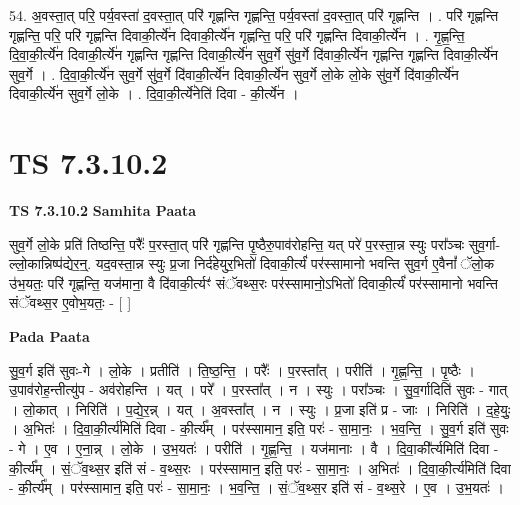 \documentclass[17pt]{extarticle}
\begin{document}
54. अ॒वस्ता॒त् परि॒ पर्य॒वस्ता॑ द॒वस्ता॒त् परि॑ गृह्णन्ति गृह्णन्ति॒ पर्य॒वस्ता॑ द॒वस्ता॒त् परि॑ गृह्णन्ति । . परि॑ गृह्णन्ति गृह्णन्ति॒ परि॒ परि॑ गृह्णन्ति दिवाकी॒र्त्ये॑न दिवाकी॒र्त्ये॑न गृह्णन्ति॒ परि॒ परि॑ गृह्णन्ति दिवाकी॒र्त्ये॑न । . गृ॒ह्ण॒न्ति॒ दि॒वा॒की॒र्त्ये॑न दिवाकी॒र्त्ये॑न गृह्णन्ति गृह्णन्ति दिवाकी॒र्त्ये॑न सुव॒र्गे सु॑व॒र्गे दि॑वाकी॒र्त्ये॑न गृह्णन्ति गृह्णन्ति दिवाकी॒र्त्ये॑न सुव॒र्गे । . दि॒वा॒की॒र्त्ये॑न सुव॒र्गे सु॑व॒र्गे दि॑वाकी॒र्त्ये॑न दिवाकी॒र्त्ये॑न सुव॒र्गे लो॒के लो॒के सु॑व॒र्गे दि॑वाकी॒र्त्ये॑न दिवाकी॒र्त्ये॑न सुव॒र्गे लो॒के । . दि॒वा॒की॒र्त्ये॑नेति॑ दिवा - की॒र्त्ये॑न । \newline
\pagebreak
{}

\section{ TS 7.3.10.2 }

\textbf{TS 7.3.10.2 } \newline
\textbf{Samhita Paata} \newline

सुव॒र्गे लो॒के प्रति॑ तिष्ठन्ति॒ परैः᳚ प॒रस्ता॒त् परि॑ गृह्णन्ति पृ॒ष्ठैरु॒पाव॑रोहन्ति॒ यत् परे॑ प॒रस्ता॒न्न स्युः परा᳚ञ्चः सुव॒र्गा-ल्लो॒कान्निष्प॑द्येर॒न्॒. यद॒वस्ता॒न्न स्युः प्र॒जा निर्द॑हेयुर॒भितो॑ दिवाकी॒र्त्यं॑ पर॑स्सामानो भवन्ति सुव॒र्ग ए॒वैनां᳚ ॅलो॒क उ॑भ॒यतः॒ परि॑ गृह्णन्ति॒ यज॑माना॒ वै दि॑वाकी॒र्त्यꣳ॑ संॅवथ्स॒रः पर॑स्सामानो॒ऽभितो॑ दिवाकी॒र्त्यं॑ पर॑स्सामानो भवन्ति संॅवथ्स॒र ए॒वोभ॒यतः॒ - [  ] \newline

\textbf{Pada Paata} \newline

सु॒व॒र्ग इति॑ सुवः-गे । लो॒के । प्रतीति॑ । ति॒ष्ठ॒न्ति॒ । परैः᳚ । प॒रस्ता᳚त् । परीति॑ । गृ॒ह्ण॒न्ति॒ । पृ॒ष्ठैः । उ॒पाव॑रोह॒न्तीत्यु॑प - अव॑रोहन्ति । यत् । परे᳚ । प॒रस्ता᳚त् । न । स्युः । परा᳚ञ्चः । सु॒व॒र्गादिति॑ सुवः - गात् । लो॒कात् । निरिति॑ । प॒द्ये॒र॒न्न् । यत् । अ॒वस्ता᳚त् । न । स्युः । प्र॒जा इति॑ प्र - जाः । निरिति॑ । द॒हे॒युः॒ । अ॒भितः॑ । दि॒वा॒की॒र्त्य॑मिति॑ दिवा - की॒र्त्य᳚म् । पर॑स्सामान॒ इति॒ परः॑ - सा॒मा॒नः॒ । भ॒व॒न्ति॒ । सु॒व॒र्ग इति॑ सुवः - गे । ए॒व । ए॒ना॒न्न् । लो॒के । उ॒भ॒यतः॑ । परीति॑ । गृ॒ह्ण॒न्ति॒ । यज॑मानाः । वै । दि॒वा॒की᳚र्त्यमिति॑ दिवा - की॒र्त्य᳚म् । सं॒ॅव॒थ्स॒र इति॑ सं - व॒थ्स॒रः । पर॑स्सामान॒ इति॒ परः॑ - सा॒मा॒नः॒ । अ॒भितः॑ । दि॒वा॒की॒र्त्य॑मिति॑ दिवा - की॒र्त्य᳚म् । पर॑स्सामान॒ इति॒ परः॑ - सा॒मा॒नः॒ । भ॒व॒न्ति॒ । सं॒ॅव॒थ्स॒र इति॑ सं - व॒थ्स॒रे । ए॒व । उ॒भ॒यतः॑ ।  \newline
\end{document}
